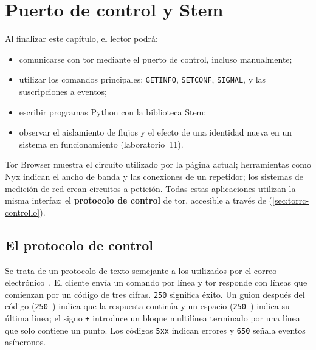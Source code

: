 \chapter{Puerto de control y Stem}\label{cap:18-stem}

\begin{obiettivi}
Al finalizar este capítulo, el lector podrá:
\begin{itemize}[nosep]
  \item comunicarse con tor mediante el puerto de control, incluso manualmente;
  \item utilizar los comandos principales: \texttt{GETINFO}, \texttt{SETCONF}, \texttt{SIGNAL},  y las suscripciones a eventos;
  \item escribir programas Python con la biblioteca Stem;
  \item observar el aislamiento de flujos y el efecto de una identidad nueva en un sistema en funcionamiento (laboratorio~11).
\end{itemize}
\end{obiettivi}

Tor Browser muestra el circuito utilizado por la página actual; herramientas como Nyx indican el ancho de banda y las conexiones de un repetidor; los sistemas de medición de red crean circuitos a petición. Todas estas aplicaciones utilizan la misma interfaz: el \textbf{protocolo de control} de tor, accesible a través de  (\cref{sec:torrc-controllo}).

\section{El protocolo de control}\label{sec:stem-protocollo}

Se trata de un protocolo de texto semejante a los utilizados por el correo electrónico~. El cliente envía un comando por línea y tor responde con líneas que comienzan por un código de tres cifras. \texttt{250} significa éxito. Un guion después del código (\texttt{250-}) indica que la respuesta continúa y un espacio (\texttt{250 }) indica su última línea; el signo \texttt{+} introduce un bloque multilínea terminado por una línea que solo contiene un punto. Los códigos \texttt{5xx} indican errores y \texttt{650} señala eventos asíncronos.

